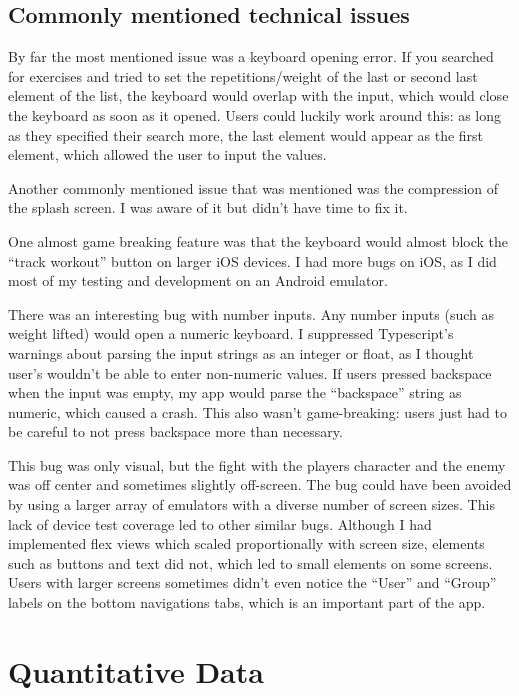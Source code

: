 \documentclass{l4proj}
\begin{document}
\section{Commonly mentioned technical issues}
By far the most mentioned issue was a keyboard opening error. If you searched for exercises and tried to set the repetitions/weight of the last or second last element of the list, the keyboard would overlap with the input, which would close the keyboard as soon as it opened. Users could luckily work around this: as long as they specified their search more, the last element would appear as the first element, which allowed the user to input the values.

Another commonly mentioned issue that was mentioned was the compression of the splash screen. I was aware of it but didn't have time to fix it. 

One almost game breaking feature was that the keyboard would almost block the ``track workout'' button on larger iOS devices. I had more bugs on iOS, as I did most of my testing and development on an Android emulator.

There was an interesting bug with number inputs. Any number inputs (such as weight lifted) would open a numeric keyboard. I suppressed Typescript's warnings about parsing the input strings as an integer or float, as I thought user's wouldn't be able to enter non-numeric values. If users pressed backspace when the input was empty, my app would parse the ``backspace'' string as numeric, which caused a crash. This also wasn't game-breaking: users just had to be careful to not press backspace more than necessary.

This bug was only visual, but the fight with the players character and the enemy was off center and sometimes slightly off-screen. The bug could have been avoided by using a larger array of emulators with a diverse number of screen sizes. This lack of device test coverage led to other similar bugs. Although I had implemented flex views which scaled proportionally with screen size, elements such as buttons and text did not, which led to small elements on some screens. Users with larger screens sometimes didn't even notice the ``User'' and ``Group'' labels on the bottom navigations tabs, which is an important part of the app.


\chapter{Quantitative Data}
\end{document}
